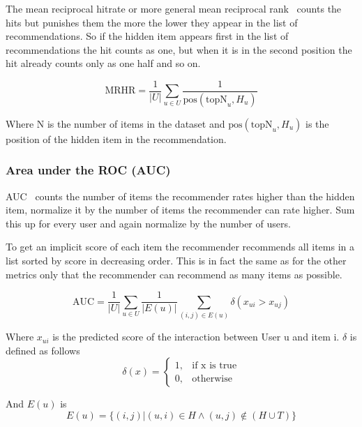 The mean reciprocal hitrate or more general mean reciprocal
rank~\cite{mrhr} counts the hits but punishes them the more the lower they
appear in the list of recommendations. So if the hidden item appears
first in the list of recommendations the hit counts as one, but when
it is in the second position the hit already counts only as one half
and so on.

\begin{equation}
\text{MRHR}=\frac{1}{|U|} \sum_{u \in U} \frac{1}{\text{pos}(\text{topN}_{u},H_{u})}
\end{equation}

Where N is the number of items in the dataset and \(\text{pos}(\text{topN}_{u},H_{u})\)
is the position of the hidden item in the recommendation.


\subsubsection{Area under the ROC (AUC)}

AUC~\cite{Rendle:2009:BBP:1795114.1795167} counts the number of items the recommender rates
higher than the hidden item, normalize it by the number of items the
recommender can rate higher. Sum this up for every user and again
normalize by the number of users.

To get an implicit score of each item the recommender recommends all
items in a list sorted by score in decreasing order. This is in fact the same
as for the other metrics only that the recommender can recommend as
many items as possible.

\begin{equation}
\text{AUC}=\frac{1}{|U|}\sum_{u \in U} \frac{1}{|E(u)|} \sum_{(i,j) \in E(u)} \delta(x_{ui}>x_{uj})
\end{equation}

Where \(x_{ui}\) is the predicted score of the interaction between User u and item i.
\(\delta\) is defined as follows
\begin{equation}
\delta(x)=\begin{cases}1, & \text{if x is true} \\
                       0, & \text{otherwise}
\end{cases}
\end{equation}

And \(E(u)\) is 
\begin{equation}
E(u) =\{(i,j)|(u,i) \in H \land (u,j) \not\in (H \cup T)\}
\end{equation}


